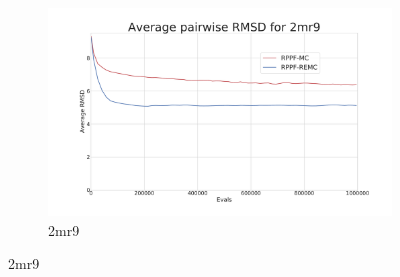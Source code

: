 \begin{figure}[ht]\ContinuedFloat
  \begin{subfigure}{0.7\linewidth}
    \centering
    \includegraphics[width=1\linewidth]{Figuras/plots/rmsd_convergence/avg_rmsd_2mr9.pdf}
    \caption{2mr9}
  \end{subfigure}
\end{figure}